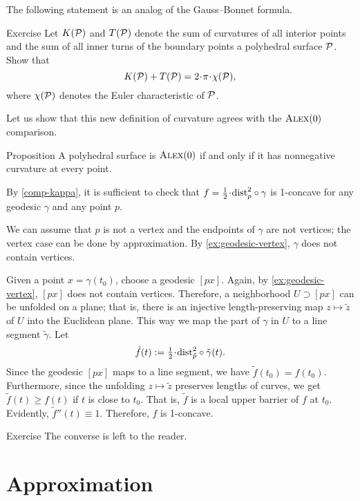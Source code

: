 The following statement is an analog of the Gauss--Bonnet formula.

\begin{thm}{Exercise}\label{ex:gauss-bonnet}
Let $K(\mathcal{P})$ and $T(\mathcal{P})$ denote the sum of curvatures of all interior points
and the sum of all inner turns of the boundary points a polyhedral surface $\mathcal{P}$.
Show that
\[K(\spc{P})+T(\spc{P})=2\cdot\pi\cdot\chi(\spc{P}),\]
where $\chi(\mathcal{P})$ denotes the Euler characteristic of $\mathcal{P}$.
\end{thm}

Let us show that this new definition of curvature agrees with the $\textsc{Alex}(0)$ comparison.

\begin{thm}{Proposition}\label{prop:poly-CBB}
A polyhedral surface is $\textsc{Alex}(0)$ if and only if it has nonnegative curvature at every point.
\end{thm}

By \ref{comp-kappa}, it is sufficient to check that
$f=\tfrac12\cdot\distfun_p^2\circ\gamma$ is 1-concave for any geodesic $\gamma$ and any point $p$.

We can assume that $p$ is not a vertex and the endpoints of $\gamma$ are not vertices;
the vertex case can be done by approximation.
By \ref{ex:geodesic-vertex}, $\gamma$ does not contain vertices.

Given a point $x=\gamma(t_0)$, choose a geodesic $[px]$.
Again, by \ref{ex:geodesic-vertex}, $[px]$ does not contain vertices.
Therefore, a neighborhood $U\supset [px]$ can be unfolded on a plane;
that is, there is an injective length-preserving map $z\mapsto \tilde z$
of $U$ into the Euclidean plane.
This way we map the part of $\gamma$ in $U$ to a line segment $\tilde\gamma$.
Let
\[\tilde f(t)\df\tfrac12\cdot\distfun_{\tilde p}^2\circ\tilde \gamma(t).\]
Since the geodesic $[px]$ maps to a line segment, we have $\tilde f(t_0)= f(t_0)$.
Furthermore, since the unfolding $z\mapsto \tilde z$ preserves lengths of curves, we get
$\tilde f(t)\ge f(t)$ if $t$ is close to $t_0$.
That is, $\tilde f$ is a local upper barrier of $f$ at $t_0$.
Evidently, $\tilde f''(t)\equiv 1$.
Therefore, $f$ is 1-concave.

\begin{thm}{Exercise}\label{ex:poly-CBB}
The converse is left to the reader.\qeds
\end{thm}

\section{Approximation}

